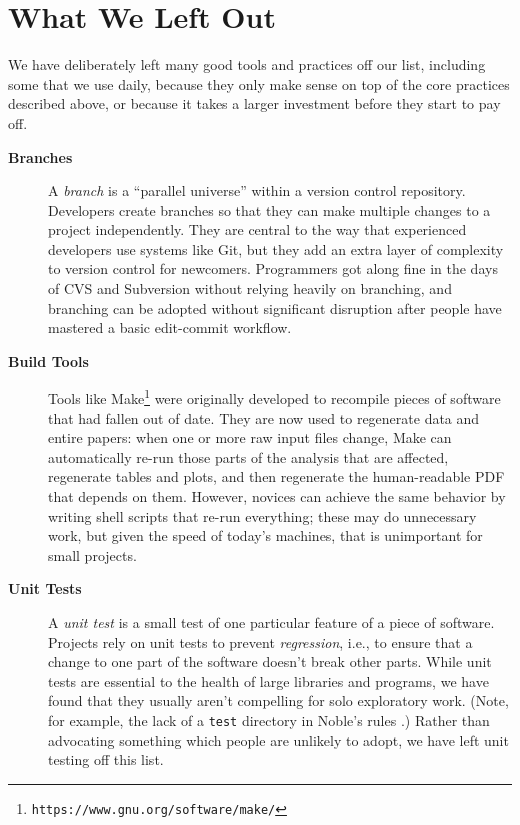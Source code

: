 \documentclass[10pt]{article}
\newcommand{\withurl}[2]{{#1}\footnote{\texttt{#2}}}
\begin{document}
\section{What We Left Out}\label{sec:omitted}

We have deliberately left many good tools and practices off our list,
including some that we use daily, because they only make sense on top
of the core practices described above, or because it takes a larger
investment before they start to pay off.

\begin{description}

\item[\textbf{Branches}]
  A \emph{branch} is a ``parallel universe'' within a version control
  repository. Developers create branches so that they can make
  multiple changes to a project independently. They are central to the
  way that experienced developers use systems like Git, but they add
  an extra layer of complexity to version control for newcomers.
  Programmers got along fine in the days of CVS and Subversion without
  relying heavily on branching, and branching can be adopted without
  significant disruption after people have mastered a basic
  edit-commit workflow.

\item[\textbf{Build Tools}] Tools like
  \withurl{Make}{https://www.gnu.org/software/make/} were originally
  developed to recompile pieces of software that had fallen out of
  date. They are now used to regenerate data and entire papers: when
  one or more raw input files change, Make can automatically re-run
  those parts of the analysis that are affected, regenerate tables and
  plots, and then regenerate the human-readable PDF that depends on
  them.  However, novices can achieve the same behavior by writing
  shell scripts that re-run everything; these may do unnecessary work,
  but given the speed of today's machines, that is unimportant for
  small projects.

\item[\textbf{Unit Tests}] A \emph{unit test} is a small test of one
  particular feature of a piece of software. Projects rely on unit
  tests to prevent \emph{regression}, i.e., to ensure that a change to
  one part of the software doesn't break other parts. While unit tests
  are essential to the health of large libraries and programs, we have
  found that they usually aren't compelling for solo exploratory
  work. (Note, for example, the lack of a \texttt{test} directory in
  Noble's rules \cite{noble2009}.)  Rather than advocating something
  which people are unlikely to adopt, we have left unit testing off
  this list.


\end{description}
\end{document}
